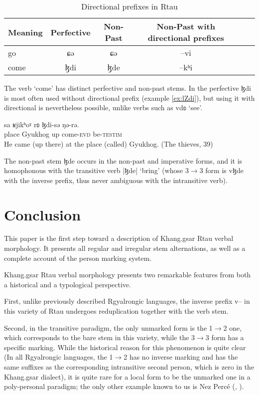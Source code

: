 \documentclass[oneside,a4paper,11pt]{article}
\newcommand{\ipa}[1]{{\phon #1}} %
\begin{document}
\begin{table}[H]
\caption{Directional prefixes in Rtau} \label{tab:motion.irr} \centering
\begin{tabular}{lccccc}
\toprule
Meaning & Perfective & Non-Past & Non-Past with directional prefixes \\
\midrule
go & \ipa{ɕə} &\ipa{ɕə} & \ipa{--vi} \\
come & \ipa{ɮdi} &\ipa{ɮde} & \ipa{--kʰi} \\
\bottomrule
\end{tabular}
\end{table}

The verb `come' has distinct perfective and non-past stems. In the perfective \ipa{ɮdi} is most often used   without directional prefix (example \ref{ex:lZdi}), but using it with directional is nevertheless possible, unlike verbs such as \ipa{vdʚ} `see'.

\begin{exe}
\ex \label{ex:lZdi}
\gll 
\ipa{sa}  	\ipa{ʁjikʰoˠ}  	\ipa{rʚ}  	\ipa{ɮdi-sə}  	\ipa{ŋə-rə.}   \\
place Gyukhog up come-\textsc{evd} be-\textsc{testim} \\
\glt He came (up there) at the place (called) Gyukhog. (The thieves, 39)
\end{exe}

The non-past stem \ipa{ɮde} occurs in the non-past and imperative forms, and it is homophonous with the transitive verb |\ipa{ɮde}| `bring' (whose 3$\rightarrow$3 form is \ipa{vɮde} with the inverse prefix, thus never ambiguous with the intransitive verb).

 
\section{Conclusion}
This paper is the first step toward a description of Khang.gsar Rtau verbal morphology. It presents all regular and irregular stem alternations, as well as a complete account of the person marking system.

Khang.gsar Rtau verbal morphology presents two remarkable features  from both a historical and a typological perspective.

First, unlike previously described Rgyalrongic languages, the inverse prefix \ipa{v}-- in this variety of Rtau undergoes reduplication together with the verb stem. 

Second, in the transitive paradigm, the only unmarked form is the 1$\rightarrow$2 one, which corresponds to the bare stem in this variety, while the 3$\rightarrow$3 form has a specific marking. While the historical reason for this phenomenon is quite clear (In all Rgyalrongic languages, the 1$\rightarrow$2 has no inverse marking and has the same suffixes as the corresponding intransitive second person, which is zero in the Khang.gsar dialect), it is quite rare for a local form to be the unmarked one in a poly-personal paradigm; the only other example known to us is Nez Percé (\citealt{Rude1997}, \citealt[166-167]{zuniga06}).





\end{document}

